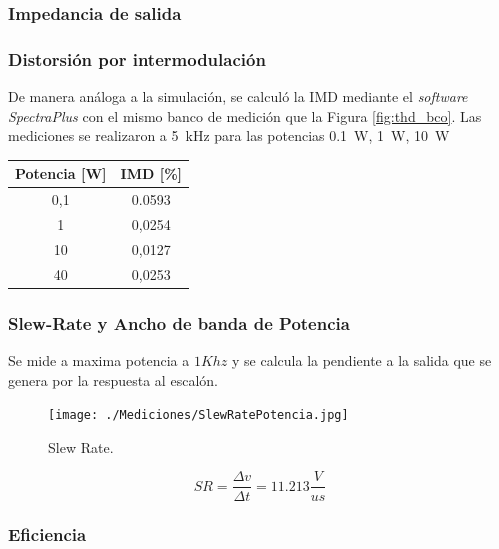 		\subsubsection{Impedancia de salida}
%
%
		\subsubsection{Distorsión por intermodulación}

		De manera análoga a la simulación, se calculó la IMD mediante el \textit{software SpectraPlus} con el mismo banco de medición que la Figura \ref{fig:thd_bco}. Las mediciones se realizaron a \SI{5}{\kilo\hertz} para las potencias \SI{0.1}{\watt}, \SI{1}{\watt}, \SI{10}{\watt}

			\begin{table}[H]
				\centering
				\begin{tabular}{cc}
				\toprule
				Potencia [W] & IMD [\%]\\
				\midrule
				0,1 & 0.0593 \\
				1 & 0,0254 \\
				10 & 0,0127 \\
				40 & 0,0253 \\
				\bottomrule
				\end{tabular}
			\end{table}



		\subsubsection{Slew-Rate y Ancho de banda de Potencia}
		Se mide a maxima potencia a $1Khz$ y se calcula la pendiente a la salida que se genera por la respuesta al escalón.
	

		\begin{figure}[H]
			\centering
			\texttt{[image: ./Mediciones/SlewRatePotencia.jpg]}
			\caption{Slew Rate.}
		\end{figure}

		\begin{equation*}
			SR  = \frac{\varDelta v}{\varDelta t} = 11.213 \frac{V}{us}
		\end{equation*}

		\subsubsection{Eficiencia}

